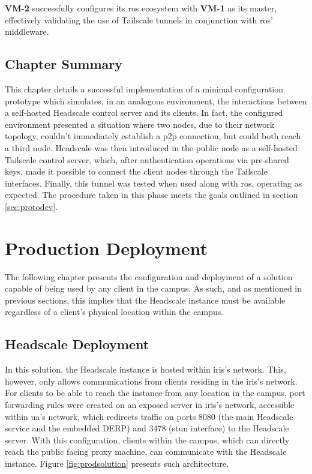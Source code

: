 \documentclass[11pt,twoside,a4paper]{report}
\begin{document}
\textbf{VM-2} successfully configures its \ac{ros} ecosystem with \textbf{VM-1} as its master, effectively validating the use of Tailscale tunnels in conjunction with \ac{ros}' middleware.

\section{Chapter Summary}

This chapter details a successful implementation of a minimal configuration prototype which simulates, in an analogous environment, the interactions between a self-hosted Headscale control server and its clients. In fact, the configured environment presented a situation where two nodes, due to their network topology, couldn't immediately establish a \ac{p2p} connection, but could both reach a third node. Headscale was then introduced in the public node as a self-hosted Tailscale control server, which, after authentication operations via pre-shared keys, made it possible to connect the client nodes through the Tailscale interfaces. Finally, this tunnel was tested when used along with \ac{ros}, operating as expected. The procedure taken in this phase meets the goals outlined in section \ref{sec:protodev}.

\chapter{Production Deployment}

The following chapter presents the configuration and deployment of a solution capable of being used by any client in the campus. As such, and as mentioned in previous sections, this implies that the Headscale instance must be available regardless of a client's physical location within the campus.

\section{Headscale Deployment}

In this solution, the Headscale instance is hosted within \ac{iris}'s network. This, however, only allows communications from clients residing in the \ac{iris}'s network. For clients to be able to reach the instance from any location in the campus, port forwarding rules were created on an exposed server in \ac{iris}'s network, accessible within \ac{ua}'s network, which redirects traffic on ports 8080 (the main Headscale service and the embedded \ac{DERP}) and 3478 (\ac{stun} interface) to the Headscale server. With this configuration, clients within the campus, which can directly reach the public facing proxy machine, can communicate with the Headscale instance. Figure \ref{fig:prodsolution} presents such architecture.
\end{document}
